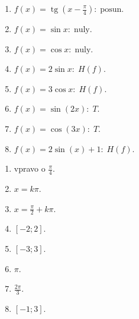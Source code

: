 \documentclass[11pt,a4paper]{article}
\begin{document}
\begin{zadaniReseniBox}[title={Domácí úkol}]
\begin{enumerate}[label=\alph*)]
\item $f(x)=\operatorname{tg}(x-\frac{\pi}{4}):\;\text{posun}$.
\item $f(x)=\sin x:\;\text{nuly}$.
\item $f(x)=\cos x:\;\text{nuly}$.
\item $f(x)=2\sin x:\; H(f)$.
\item $f(x)=3\cos x:\;H(f)$.
\item $f(x)=\sin(2x):\;T$.
\item $f(x)=\cos(3x):\;T$.
\item $f(x)=2\sin(x)+1:\;H(f)$.
\end{enumerate}
\tcblower
\begin{enumerate}[label=\alph*)]
\item vpravo o $\frac{\pi}{4}$.
\item $x=k\pi$.
\item $x=\frac{\pi}{2}+k\pi$.
\item $[-2;2]$.
\item $[-3;3]$.
\item $\pi$.
\item $\frac{2\pi}{3}$.
\item $[-1;3]$.
\end{enumerate}
\end{zadaniReseniBox}
\end{document}
